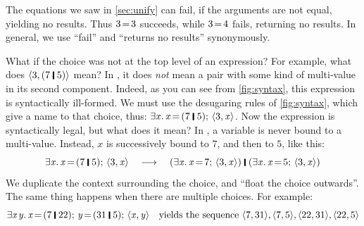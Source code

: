 \documentclass[acmsmall]{acmart}
\newcommand{\Varid}[1]{\mathit{#1}}
\begin{document}
The equations we saw in \cref{sec:unify} can fail, if the arguments
are not equal, yielding no results.  Thus \ensuremath{\mathrm{3}\hspace{-0.14em}=\hspace{-0.14em}\mathrm{3}} succeeds,
while \ensuremath{\mathrm{3}\hspace{-0.14em}=\hspace{-0.14em}\mathrm{4}} fails, returning no results.  In general, we use ``fail''
and ``returns no results'' synonymously.

What if the choice was not at the top level of an expression?  For example,
what does \ensuremath{\langle{}\mathrm{3},(\mathrm{7}\;\rule[-0.1em]{0.15em}{0.75em}\;\mathrm{5})\rangle} mean?
In \versecalc{}, it does \emph{not} mean a pair with some kind of multi-value in its second component.
Indeed, as you can see from \cref{fig:syntax}, this expression is syntactically ill-formed.
We must use the desugaring rules of \cref{fig:syntax}, which give a name to that choice, thus: \ensuremath{\exists\Varid{x}.\,\Varid{x}\hspace{-0.14em}=\hspace{-0.14em}(\mathrm{7}\;\rule[-0.1em]{0.15em}{0.75em}\;\mathrm{5});\,\langle{}\mathrm{3},\Varid{x}\rangle}.
Now the expression is syntactically legal, but what does it mean?  In \versecalc{}, a variable is never bound to a multi-value.
Instead, \ensuremath{\Varid{x}} is successively bound to \ensuremath{\mathrm{7}}, and then to \ensuremath{\mathrm{5}}, like this:
$$
\ensuremath{\exists\Varid{x}.\,\Varid{x}\hspace{-0.14em}=\hspace{-0.14em}(\mathrm{7}\;\rule[-0.1em]{0.15em}{0.75em}\;\mathrm{5});\,\langle{}\mathrm{3},\Varid{x}\rangle} \quad \movesto \quad \ensuremath{(\exists\Varid{x}.\,\Varid{x}\hspace{-0.14em}=\hspace{-0.14em}\mathrm{7};\,\langle{}\mathrm{3},\Varid{x}\rangle)\;\rule[-0.1em]{0.15em}{0.75em}\;(\exists\Varid{x}.\,\Varid{x}\hspace{-0.14em}=\hspace{-0.14em}\mathrm{5};\,\langle{}\mathrm{3},\Varid{x}\rangle)}
$$
We duplicate the context surrounding the choice, and ``float the choice outwards''.
The same thing happens when there are multiple choices.  For example:
$$
\ensuremath{\exists\Varid{x}\hspace{0.1em}\Varid{y}.\,\Varid{x}\hspace{-0.14em}=\hspace{-0.14em}(\mathrm{7}\;\rule[-0.1em]{0.15em}{0.75em}\;\mathrm{22});\,\Varid{y}\hspace{-0.14em}=\hspace{-0.14em}(\mathrm{31}\;\rule[-0.1em]{0.15em}{0.75em}\;\mathrm{5});\,\langle{}\Varid{x},\Varid{y}\rangle}
\quad
\text{yields the sequence \ensuremath{\langle{}\mathrm{7},\mathrm{31}\rangle,\langle{}\mathrm{7},\mathrm{5}\rangle,\langle{}\mathrm{22},\mathrm{31}\rangle,\langle{}\mathrm{22},\mathrm{5}\rangle}}
$$
\end{document}

